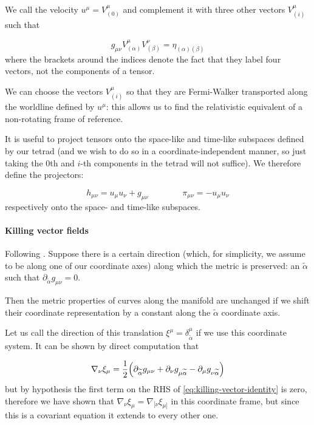 \documentclass[main.tex]{subfiles}
\begin{document}
We call the velocity \(u^\mu = V^\mu _{(0)}\) and complement it with three other vectors \(V^\mu_{(i)}\) such that

\begin{equation}
    g_{\mu\nu} V^\mu _{(\alpha)} V^\nu _{(\beta)} = \eta_{(\alpha) (\beta)}
\end{equation}
where the brackets around the indices denote the fact that they label four vectors, not the components of a tensor.

We can choose the vectors \(V_{(i)}^\mu\) so that they are Fermi-Walker transported along the worldline defined by \(u^\mu\): this allows us to find the relativistic equivalent of a non-rotating frame of reference.

It is useful to project tensors onto the space-like and time-like subspaces defined by our tetrad (and we wish to do so in a coordinate-independent manner,  so just taking the 0th and $i $-th components in the tetrad will not suffice). We therefore define the projectors:

\begin{equation}
    h_{\mu \nu} = u_\mu u_\nu + g_{\mu \nu} \qquad \qquad \pi_{\mu\nu} = -u_\mu u_\nu
\end{equation}
respectively onto the space- and time-like subspaces.

\paragraph{Killing vector fields}

Following \cite[section 25.2, page 650]{MisnerThorneWheeler:1973}.
Suppose there is a certain direction (which, for simplicity, we assume to be along one of our coordinate axes) along which the metric is preserved: an \(\widetilde{\alpha}\) such that \(\partial_{\widetilde{\alpha}} g_{\mu\nu} =0\).

Then the metric properties of curves along the manifold are unchanged if we shift their coordinate representation by a constant along the \(\widetilde{\alpha}\) coordinate axis.

Let us call the direction of this translation \(\xi^\mu = \delta^\mu_{\widetilde{\alpha}}\) if we use this coordinate system. It can be shown by direct computation that

\begin{equation} \label{eq:killing-vector-identity}
    \nabla_{\nu} \xi_\mu = \frac{1}{2} \qty(\partial_{\widetilde{\alpha}}
    g_{\mu\nu} + \partial_\nu g_{\mu\widetilde{\alpha}} -
    \partial_\mu g_{\nu \widetilde{\alpha}})
\end{equation}
but by hypothesis the first term on the RHS of \eqref{eq:killing-vector-identity} is zero, therefore we have shown that \(\nabla_{\nu} \xi_\mu = \nabla_{[\nu} \xi_{\mu]}\) in this coordinate frame, but since this is a covariant equation it extends to every other one.
\end{document}
